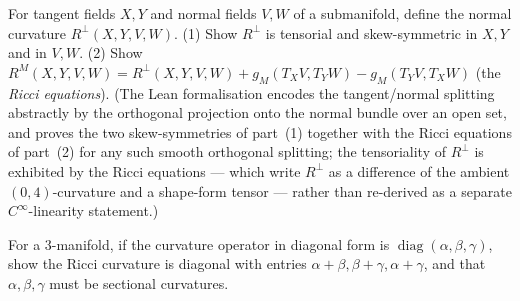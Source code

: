 \begin{remark}[Exercise 3.4.14]
  \label{rem:pet-ch3-ex-14}
  \leanok
  For tangent fields $X,Y$ and normal fields $V,W$ of a submanifold, define the
  normal curvature $R^\perp(X,Y,V,W)$. (1) Show $R^\perp$ is tensorial and
  skew-symmetric in $X,Y$ and in $V,W$. (2) Show
  $R^M(X,Y,V,W)=R^\perp(X,Y,V,W)+g_M(T_XV,T_YW)-g_M(T_YV,T_XW)$ (the
  \emph{Ricci equations}).
  (The Lean formalisation encodes the tangent/normal splitting abstractly by the
  orthogonal projection onto the normal bundle over an open set, and proves the
  two skew-symmetries of part~(1) together with the Ricci equations of part~(2)
  for any such smooth orthogonal splitting; the tensoriality of $R^\perp$ is
  exhibited by the Ricci equations — which write $R^\perp$ as a difference of the
  ambient $(0,4)$-curvature and a shape-form tensor — rather than re-derived as a
  separate $C^\infty$-linearity statement.)
\end{remark}

\begin{remark}[Exercise 3.4.15]
  \label{rem:pet-ch3-ex-15}
  \leanok
  For a $3$-manifold, if the curvature operator in diagonal form is
  $\operatorname{diag}(\alpha,\beta,\gamma)$, show the Ricci curvature is diagonal
  with entries $\alpha+\beta,\beta+\gamma,\alpha+\gamma$, and that
  $\alpha,\beta,\gamma$ must be sectional curvatures.
\end{remark}

